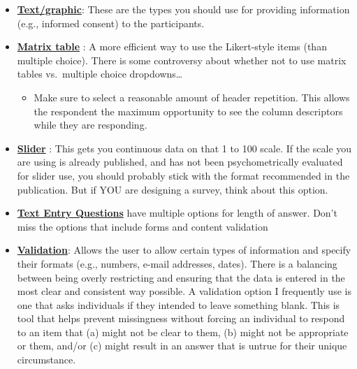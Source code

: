 \documentclass[
  english,
]{book}
\providecommand{\tightlist}{%
  \setlength{\itemsep}{0pt}\setlength{\parskip}{0pt}}
\begin{document}
\begin{itemize}
\tightlist
\item
  \href{https://www.qualtrics.com/support/survey-platform/survey-module/editing-questions/question-types-guide/static-content/descriptive-text-and-graphic/}{\textbf{Text/graphic}}: These are the types you should use for providing information (e.g., informed consent) to the participants.\\
\item
  \href{https://www.qualtrics.com/support/survey-platform/survey-module/editing-questions/question-types-guide/standard-content/matrix-table/}{\textbf{Matrix table}} : A more efficient way to use the Likert-style items (than multiple choice). There is some controversy about whether not to use matrix tables vs.~multiple choice dropdowns\ldots{}

  \begin{itemize}
  \tightlist
  \item
    Make sure to select a reasonable amount of header repetition. This allows the respondent the maximum opportunity to see the column descriptors while they are responding.
  \end{itemize}
\item
  \href{https://www.qualtrics.com/support/survey-platform/survey-module/editing-questions/question-types-guide/standard-content/slider/}{\textbf{Slider}} : This gets you continuous data on that 1 to 100 scale. If the scale you are using is already published, and has not been psychometrically evaluated for slider use, you should probably stick with the format recommended in the publication. But if YOU are designing a survey, think about this option.
\item
  \href{https://www.qualtrics.com/support/survey-platform/survey-module/editing-questions/question-types-guide/standard-content/text-entry/}{\textbf{Text Entry Questions}} have multiple options for length of answer. Don't miss the options that include forms and content validation\\
\item
  \href{https://www.qualtrics.com/support/survey-platform/survey-module/editing-questions/validation/}{\textbf{Validation}}: Allows the user to allow certain types of information and specify their formats (e.g., numbers, e-mail addresses, dates). There is a balancing between being overly restricting and ensuring that the data is entered in the most clear and consistent way possible. A validation option I frequently use is one that asks individuals if they intended to leave something blank. This is tool that helps prevent missingness without forcing an individual to respond to an item that (a) might not be clear to them, (b) might not be appropriate or them, and/or (c) might result in an answer that is untrue for their unique circumstance.
\end{itemize}
\end{document}

